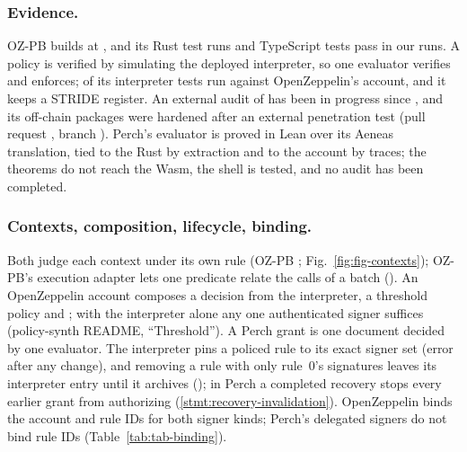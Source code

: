 \subsubsection{Evidence.}\label{sec:compare-evidence} OZ-PB builds at
, and its  Rust test runs and
 TypeScript tests pass in our runs. A policy is verified by
simulating the deployed interpreter, so one evaluator verifies and enforces;
 of its  interpreter tests
run against OpenZeppelin's  account, and it keeps a STRIDE
register. An external audit of  has been in progress since
, and its off-chain packages were hardened after an external
penetration test (pull request , branch
). Perch's evaluator is proved in Lean over its Aeneas
translation, tied to the Rust by extraction and to the account by
 traces; the theorems do not reach the Wasm, the shell is
tested, and no audit has been completed.

\subsubsection{Contexts, composition, lifecycle, binding.}\label{sec:compare-rest}
Both judge each context under its own rule (OZ-PB
; Fig.~\ref{fig:fig-contexts}); OZ-PB's
execution adapter lets one predicate relate the calls of a batch
(). An OpenZeppelin account composes a decision from
the interpreter, a threshold policy and ; with the
interpreter alone any one authenticated signer suffices (policy-synth README,
``Threshold''). A Perch grant is one document decided by one evaluator. The
interpreter pins a policed rule to its exact signer set (error
 after any change), and removing a rule with only
rule~0's signatures leaves its interpreter entry until it archives
(); in Perch a completed recovery stops every earlier
grant from authorizing (\ref{stmt:recovery-invalidation}). OpenZeppelin  binds the
account and rule IDs for both signer kinds; Perch's delegated signers do not bind
rule IDs (Table~\ref{tab:tab-binding}).

